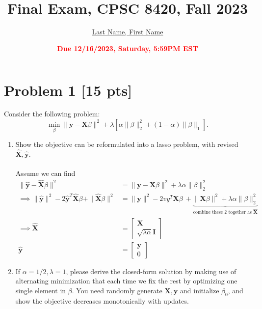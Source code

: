 \documentclass[11pt]{article}
\title{{\bf Final Exam, CPSC 8420, Fall 2023}}
\author{\Large\underline{Last Name, First Name}}%
\date{\textbf{\Large\textcolor{red}{Due 12/16/2023, Saturday, 5:59PM EST}}}
\newcommand{\mtx}[1]{\mathbf{#1}}
\newcommand{\vct}[1]{\mathbf{#1}}
\def \mX {\mtx{X}}
\def \vy {\vct{y}}
\begin{document}
\maketitle

\section{Problem 1 [15 pts]}
Consider the following problem:
\begin{equation}
\min_{\beta} \|\vy-\mX\beta\|^2+\lambda[\alpha\|\beta\|^2_2+(1-\alpha)\|\beta\|_1].
\end{equation}
\begin{enumerate}
	\item Show the objective can be reformulated into a lasso problem, with revised 
	$\hat{\mX}, \hat{\vy}$.\\
	\\Assume we can find
	\begin{align*}
		\|\hat{\vy}-\hat{\mX}\beta\|^2 &= \|\vy-\mX\beta\|^2+\lambda\alpha\|\beta\|^2_2\\
		\implies \|\hat{\vy}\|^2 - 2\hat{\vy}^T\hat{\mX}\beta + \|\hat{\mX}\beta\|^2 &= \|\vy\|^2 - 2vy^T\mX\beta\ + 
		\underbrace{\|\mX\beta\|^2 + \lambda\alpha\|\beta\|^2_2}_{\text{combine these 2 together as }\hat{\mX}}\\
		\implies \hat{\mX} &=  \begin{bmatrix}
			\mX\\
			\sqrt{\lambda\alpha}\vct{I}
			\end{bmatrix}\\
			\hat{\vy} &= \begin{bmatrix}
				\vy\\
				0
				\end{bmatrix}
	\end{align*}

	\item If $\alpha=1/2,\lambda=1$, please derive the closed-form solution by making use of alternating minimization that each time we fix the rest by optimizing one single element in $\beta$. You need randomly generate $\mX, \vy$ and initialize  $\beta_0$, and show the objective decreases monotonically with updates.
		\begin{enumerate} 
	

\end{enumerate}
\end{enumerate}
\end{document}
